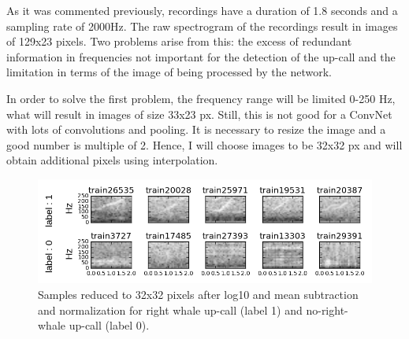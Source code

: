 \documentclass[]{article}
\begin{document}
As it was commented previously, recordings have a duration of 1.8 seconds and a sampling rate of 2000Hz. The raw spectrogram of the recordings result in images of 129x23 pixels. Two problems arise from this: the excess of redundant information in frequencies not important for the detection of the up-call and the limitation in terms of the image of being processed by the network.

In order to solve the first problem, the frequency range will be limited 0-250 Hz, what will result in images of size 33x23 px. Still, this is not good for a ConvNet with lots of convolutions and pooling. It is necessary to resize the image and a good number is multiple of 2. Hence, I will choose images to be 32x32 px and will obtain additional pixels using interpolation. %

\begin{figure}[htpb!]
\centering
\includegraphics[width= \textwidth]{./images/2_samples_cropped}
\caption{Samples reduced to 32x32 pixels after log10 and mean subtraction and normalization for right whale up-call (label 1) and no-right-whale up-call (label 0).  \label{img:samples_processed}}
\end{figure} 
\end{document}
